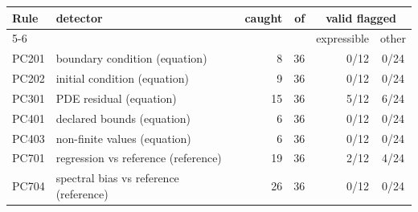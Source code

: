 \begin{tabular}{llrrrc}
\toprule
Rule & detector & caught & of & \multicolumn{2}{c}{valid flagged} \\
\cmidrule(lr){5-6}
 & & & & expressible & other \\
\midrule
PC201 & boundary condition (equation) & 8 & 36 & 0/12 & 0/24 \\
PC202 & initial condition (equation) & 9 & 36 & 0/12 & 0/24 \\
PC301 & PDE residual (equation) & 15 & 36 & 5/12 & 6/24 \\
PC401 & declared bounds (equation) & 6 & 36 & 0/12 & 0/24 \\
PC403 & non-finite values (equation) & 6 & 36 & 0/12 & 0/24 \\
PC701 & regression vs reference (reference) & 19 & 36 & 2/12 & 4/24 \\
PC704 & spectral bias vs reference (reference) & 26 & 36 & 0/12 & 0/24 \\
\bottomrule
\end{tabular}
